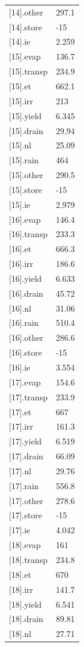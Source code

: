 {\begin{longtable}{p{}p{}}
{}[14].other & 297.1\\
{}[14].store & -15\\
{}[14].ie & 2.259\\
{}[15].evap & 136.7\\
{}[15].transp & 234.9\\
{}[15].et & 662.1\\
{}[15].irr & 213\\
{}[15].yield & 6.345\\
{}[15].drain & 29.94\\
{}[15].nl & 25.09\\
{}[15].rain & 464\\
{}[15].other & 290.5\\
{}[15].store & -15\\
{}[15].ie & 2.979\\
{}[16].evap & 146.4\\
{}[16].transp & 233.3\\
{}[16].et & 666.3\\
{}[16].irr & 186.6\\
{}[16].yield & 6.633\\
{}[16].drain & 45.72\\
{}[16].nl & 31.06\\
{}[16].rain & 510.4\\
{}[16].other & 286.6\\
{}[16].store & -15\\
{}[16].ie & 3.554\\
{}[17].evap & 154.6\\
{}[17].transp & 233.9\\
{}[17].et & 667\\
{}[17].irr & 161.3\\
{}[17].yield & 6.519\\
{}[17].drain & 66.09\\
{}[17].nl & 29.76\\
{}[17].rain & 556.8\\
{}[17].other & 278.6\\
{}[17].store & -15\\
{}[17].ie & 4.042\\
{}[18].evap & 161\\
{}[18].transp & 234.8\\
{}[18].et & 670\\
{}[18].irr & 141.7\\
{}[18].yield & 6.541\\
{}[18].drain & 89.81\\
{}[18].nl & 27.71\\

\end{longtable}}
